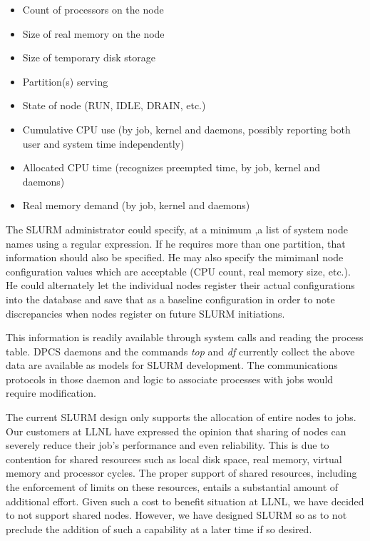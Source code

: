 \begin{itemize}
\item Count of processors on the node
\item Size of real memory on the node
\item Size of temporary disk storage
\item Partition(s) serving
\item State of node (RUN, IDLE, DRAIN, etc.)
\item Cumulative CPU use (by job, kernel and daemons, possibly reporting 
both user and system time independently)
\item Allocated CPU time (recognizes preempted time, by job, kernel and daemons)
\item Real memory demand (by job, kernel and daemons)
\end{itemize}

The SLURM administrator could specify, at a minimum ,a list of system node 
names using a regular expression. 
If he requires more than one partition, that information should also be specified. 
He may also specify the mimimanl node configuration values which are acceptable 
(CPU count, real memory size, etc.). He could alternately let the individual 
nodes register their actual configurations into the database and save that 
as a baseline configuration in order to note discrepancies when nodes register 
on future SLURM initiations.

This information is readily available through system calls and reading the
process table. DPCS daemons and the commands \textit{top} and \textit{df} 
currently collect the above data are available as models for SLURM development. 
The communications protocols in those daemon and logic to associate processes 
with jobs would require modification.

The current SLURM design only supports the allocation of entire nodes to 
jobs. Our customers at LLNL have expressed the opinion that sharing of 
nodes can severely reduce their job's performance and even reliability. 
This is due to contention for shared resources such as local disk space, 
real memory, virtual memory and processor cycles. The proper support of 
shared resources, including the enforcement of limits on these resources, 
entails a substantial amount of additional effort. Given such a cost to 
benefit situation at LLNL, we have decided to not support shared nodes. 
However, we have designed SLURM so as to not preclude the addition of 
such a capability at a later time if so desired.

